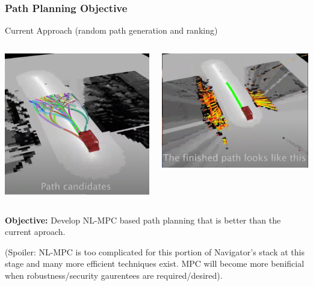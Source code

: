 \documentclass[aspectratio=169]{beamer}
\begin{document}
\begin{frame}
	\frametitle{Path Planning Objective \cite{nova}}
	Current Approach (random path generation and ranking)
	\begin{columns}
		\begin{column}{0.3\textwidth}
			\includegraphics[width = \columnwidth]{figs/NOVA-demo2_pathCanidates.png}
		\end{column}
		\begin{column}{0.35\textwidth}
			\includegraphics[width = \columnwidth]{figs/NOVA-demo2_pathSolution.png}
		\end{column}
	\end{columns}

	\textbf{Objective:} 
	Develop NL-MPC based path planning that is better than the current aproach.

	(Spoiler: NL-MPC is too complicated for this portion of Navigator's stack at this stage and many more efficient techniques exist.
	MPC will become more benificial when robustness/security gaurentees are required/desired).
\end{frame}
\end{document}
